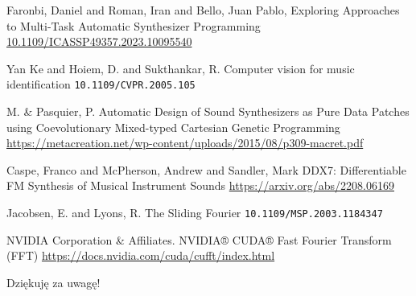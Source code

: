 \documentclass[]{beamer}
\begin{document}
\begin{frame}
  \begin{thebibliography}{99} %
   Faronbi, Daniel and Roman, Iran and Bello, Juan Pablo,
  \newblock Exploring Approaches to Multi-Task Automatic Synthesizer Programming
  \newblock \url{10.1109/ICASSP49357.2023.10095540}

   Yan Ke and Hoiem, D. and Sukthankar, R.
  \newblock Computer vision for music identification
  \newblock \texttt{10.1109/CVPR.2005.105}

   M. & Pasquier, P.
  \newblock Automatic Design of Sound Synthesizers as Pure Data Patches using Coevolutionary Mixed-typed Cartesian Genetic Programming
  \newblock \url{https://metacreation.net/wp-content/uploads/2015/08/p309-macret.pdf}

  \end{thebibliography}
\end{frame}

\begin{frame}
  \begin{thebibliography}{99} %

     Caspe, Franco and McPherson, Andrew and Sandler, Mark
    \newblock DDX7: Differentiable FM Synthesis of Musical Instrument Sounds
    \newblock \url{https://arxiv.org/abs/2208.06169}

     Jacobsen, E. and Lyons, R.
    \newblock The Sliding Fourier
    \newblock \texttt{10.1109/MSP.2003.1184347}

     NVIDIA Corporation & Affiliates.
    \newblock NVIDIA® CUDA® Fast Fourier Transform (FFT)
    \newblock \url{https://docs.nvidia.com/cuda/cufft/index.html}

  \end{thebibliography}
\end{frame}

\begin{frame}


  \centering
  \Large
  Dziękuję za uwagę!
\end{frame}
\end{document}

